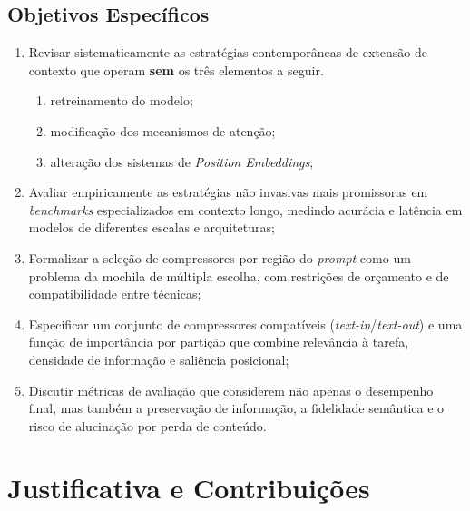 \subsection{Objetivos Específicos}
\label{subsec:objetivos-especificos}

\begin{enumerate}[leftmargin=1.8em]
\item Revisar sistematicamente as estratégias contemporâneas de extensão de contexto que operam \textbf{sem} os três elementos a seguir.
    \begin{enumerate}[label=(\alph*)]
\item retreinamento do modelo;
\item modificação dos mecanismos de atenção;
\item alteração dos sistemas de \textit{Position Embeddings};
    \end{enumerate}

\item Avaliar empiricamente as estratégias não invasivas mais promissoras em \textit{benchmarks} especializados em contexto longo, medindo acurácia e latência em modelos de diferentes escalas e arquiteturas;

\item Formalizar a seleção de compressores por região do \textit{prompt} como um problema da mochila de múltipla escolha, com restrições de orçamento e de compatibilidade entre técnicas;

\item Especificar um conjunto de compressores compatíveis (\textit{text-in}/\textit{text-out}) e uma função de importância por partição que combine relevância à tarefa, densidade de informação e saliência posicional;

\item Discutir métricas de avaliação que considerem não apenas o desempenho final, mas também a preservação de informação, a fidelidade semântica e o risco de alucinação por perda de conteúdo.
\end{enumerate}

\section{Justificativa e Contribuições}
\label{sec:justificativa}

